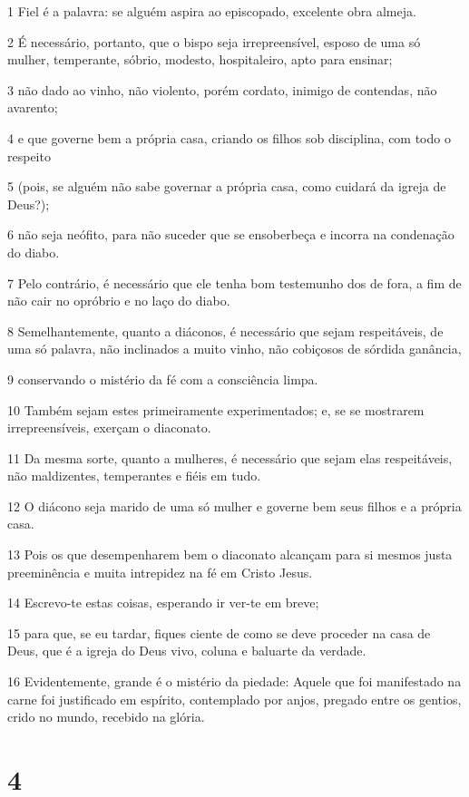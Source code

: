 \par 1 Fiel é a palavra: se alguém aspira ao episcopado, excelente obra almeja.
\par 2 É necessário, portanto, que o bispo seja irrepreensível, esposo de uma só mulher, temperante, sóbrio, modesto, hospitaleiro, apto para ensinar;
\par 3 não dado ao vinho, não violento, porém cordato, inimigo de contendas, não avarento;
\par 4 e que governe bem a própria casa, criando os filhos sob disciplina, com todo o respeito
\par 5 (pois, se alguém não sabe governar a própria casa, como cuidará da igreja de Deus?);
\par 6 não seja neófito, para não suceder que se ensoberbeça e incorra na condenação do diabo.
\par 7 Pelo contrário, é necessário que ele tenha bom testemunho dos de fora, a fim de não cair no opróbrio e no laço do diabo.
\par 8 Semelhantemente, quanto a diáconos, é necessário que sejam respeitáveis, de uma só palavra, não inclinados a muito vinho, não cobiçosos de sórdida ganância,
\par 9 conservando o mistério da fé com a consciência limpa.
\par 10 Também sejam estes primeiramente experimentados; e, se se mostrarem irrepreensíveis, exerçam o diaconato.
\par 11 Da mesma sorte, quanto a mulheres, é necessário que sejam elas respeitáveis, não maldizentes, temperantes e fiéis em tudo.
\par 12 O diácono seja marido de uma só mulher e governe bem seus filhos e a própria casa.
\par 13 Pois os que desempenharem bem o diaconato alcançam para si mesmos justa preeminência e muita intrepidez na fé em Cristo Jesus.
\par 14 Escrevo-te estas coisas, esperando ir ver-te em breve;
\par 15 para que, se eu tardar, fiques ciente de como se deve proceder na casa de Deus, que é a igreja do Deus vivo, coluna e baluarte da verdade.
\par 16 Evidentemente, grande é o mistério da piedade: Aquele que foi manifestado na carne foi justificado em espírito, contemplado por anjos, pregado entre os gentios, crido no mundo, recebido na glória.

\chapter{4}

